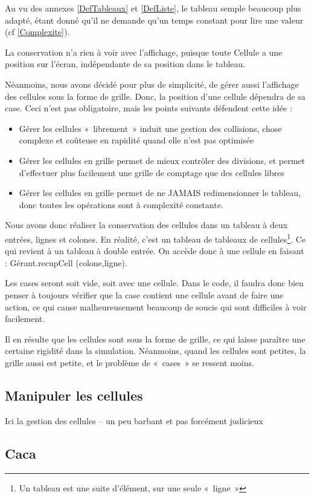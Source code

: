 Au vu des annexes \ref{DefTableaux} et \ref{DefListe}, le tableau semple beaucoup plus adapté, étant donné qu'il ne demande qu'un temps constant pour lire une valeur (cf \ref{Complexite}).

La conservation n'a rien à voir avec l'affichage, puisque toute Cellule a une position sur l'écran, indépendante de sa position dans le tableau.

Néanmoins, nous avons décidé pour plus de simplicité, de gérer aussi l'affichage des cellules sous la forme de grille. Donc, la position d'une cellule dépendra de sa case. Ceci n'est pas obligatoire, mais les points suivants défendent cette idée : 
\begin{itemize}
	\item Gérer les cellules «~librement~» induit une gestion des collisions, chose complexe et coûteuse en rapidité quand elle n'est pas optimisée
	\item Gérer les cellules en grille permet de mieux contrôler des divisions, et permet d'effectuer plus facilement une grille de comptage que des cellules libres 
	\item Gérer les cellules en grille permet de ne JAMAIS redimensionner le tableau, donc 
	toutes les opérations sont à complexité constante.
\end{itemize}

Nous avons donc réaliser la conservation des cellules dans un tableau à deux entrées, lignes et colones. En réalité, c'est un tableau de tableaux de cellules\footnote{Un tableau est une suite d'élément, sur une seule «~ligne~»}. Ce qui revient à un tableau à double entrée. On accède donc à une cellule en faisant : Gérant.recupCell (colone,ligne).

Les cases seront soit vide, soit avec une cellule. Dans le code, il faudra donc bien penser à toujours vérifier que la case contient une cellule avant de faire une action, ce qui cause malheureusement beaucoup de soucis qui sont difficiles à voir facilement.

Il en résulte que les cellules sont sous la forme de grille, ce qui laisse paraître une certaine rigidité dans la simulation. Néanmoins, quand les cellules sont petites, la grille aussi est petite, et le problème de «~cases~» se ressent moins.

\subsection{Manipuler les cellules}
	Ici la gestion des cellules -- un peu barbant et pas forcément judicieux
\subsection{Caca}
